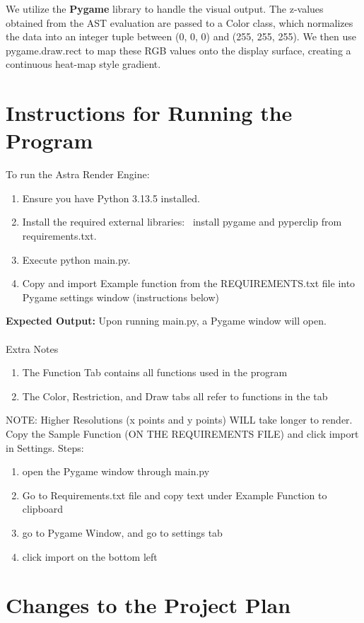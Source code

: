 \documentclass{article}
\begin{document}
We utilize the \textbf{Pygame} library to handle the visual output. The z-values obtained from the AST evaluation are passed to a Color class, which normalizes the data into an integer tuple between (0, 0, 0) and (255, 255, 255). We then use pygame.draw.rect to map these RGB values onto the display surface, creating a continuous heat-map style gradient. 

\section{\textbf{Instructions for Running the Program}}

To run the Astra Render Engine:

\begin{enumerate}
    \item Ensure you have Python 3.13.5 installed.
    \item Install the required external libraries:  install pygame and pyperclip from requirements.txt.
    \item Execute python main.py.
    \item Copy and import Example function from the REQUIREMENTS.txt file into Pygame settings window (instructions below)
\end{enumerate}
\textbf{Expected Output:} Upon running main.py, a Pygame window will open. 
\\\\Extra Notes
\begin{enumerate}
    \item{The Function Tab contains all functions used in the program}
    \item{The Color, Restriction, and Draw tabs all refer to functions in the tab}
\end{enumerate}
NOTE: Higher Resolutions (x points and y points) WILL take longer to render.
\\Copy the Sample Function (ON THE REQUIREMENTS FILE) and click import in Settings. Steps:
\begin{enumerate}
    \item open the Pygame window through main.py
    \item Go to Requirements.txt file and copy text under Example Function to clipboard
    \item go to Pygame Window, and go to settings tab
    \item click import on the bottom left
\end{enumerate}

\section{\textbf{Changes to the Project Plan}}
\end{document}
